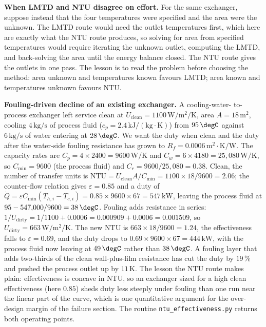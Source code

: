 \textbf{When LMTD and NTU disagree on effort.} For the same exchanger,
suppose instead that the four temperatures were specified and the area
were the unknown. The LMTD route would need the outlet temperatures
first, which here are exactly what the NTU route produces, so solving
for area from specified temperatures would require iterating the
unknown outlet, computing the LMTD, and back-solving the area until the
energy balance closed. The NTU route gives the outlets in one pass.
The lesson is to read the problem before choosing the method: area
unknown and temperatures known favours LMTD; area known and
temperatures unknown favours NTU.

\textbf{Fouling-driven decline of an existing exchanger.} A cooling-water-
to-process exchanger left service clean at $U_{\text{clean}} = 1100\,
\si{\watt\per\meter\squared\per\kelvin}$, area $A = 18\,\text{m}^2$,
cooling $4\,\text{kg/s}$ of process fluid ($c_p = 2.4\,\text{kJ}/(\text{
kg}\cdot\si{\kelvin})$) from $95\,\degC$ against $6\,\text{kg/s}$ of
water entering at $28\,\degC$. We want the duty when clean and the duty
after the water-side fouling resistance has grown to $R_f = 0.0006\,
\text{m}^2\cdot\si{\kelvin}/\text{W}$. The capacity rates are $C_p = 4
\times 2400 = 9600\,\si{\watt\per\kelvin}$ and $C_w = 6 \times 4180 =
25{,}080\,\si{\watt\per\kelvin}$, so $C_{\min} = 9600$ (the process
fluid) and $C_r = 9600/25{,}080 = 0.38$. Clean, the number of transfer
units is $\text{NTU} = U_{\text{clean}} A/C_{\min} = 1100 \times 18/
9600 = 2.06$; the counter-flow relation gives $\varepsilon = 0.85$ and a
duty of $\dot{Q} = \varepsilon C_{\min}(T_{h,i} - T_{c,i}) = 0.85 \times
9600 \times 67 = 547\,\text{kW}$, leaving the process fluid at $95 -
547{,}000/9600 = 38\,\degC$. Fouling adds resistance in series: $1/
U_{\text{dirty}} = 1/1100 + 0.0006 = 0.000909 + 0.0006 = 0.001509$, so
$U_{\text{dirty}} = 663\,\si{\watt\per\meter\squared\per\kelvin}$. The
new NTU is $663 \times 18/9600 = 1.24$, the effectiveness falls to
$\varepsilon = 0.69$, and the duty drops to $0.69 \times 9600 \times 67
= 444\,\text{kW}$, with the process fluid now leaving at $49\,\degC$
rather than $38\,\degC$. A fouling layer that adds two-thirds of the
clean wall-plus-film resistance has cut the duty by $19\,\%$ and pushed
the process outlet up by $11\,\si{\kelvin}$. The lesson the NTU route
makes plain: effectiveness is concave in NTU, so an exchanger sized for
a high clean effectiveness (here $0.85$) sheds duty less steeply under
fouling than one run near the linear part of the curve, which is one
quantitative argument for the over-design margin of the failure
section. The routine \texttt{ntu\_effectiveness.py} returns both
operating points.

